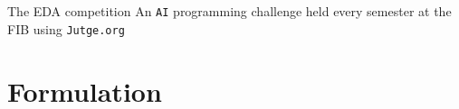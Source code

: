 \documentclass{beamer}
\begin{document}
\begin{frame}{The EDA competition}
An \texttt{AI} programming challenge held every semester at the FIB using \texttt{Jutge.org}
\begin{figure}[H]
\begin{center}
\noindent{}
\end{center}
\end{figure}
\end{frame}
\section{Formulation}
\end{document}
